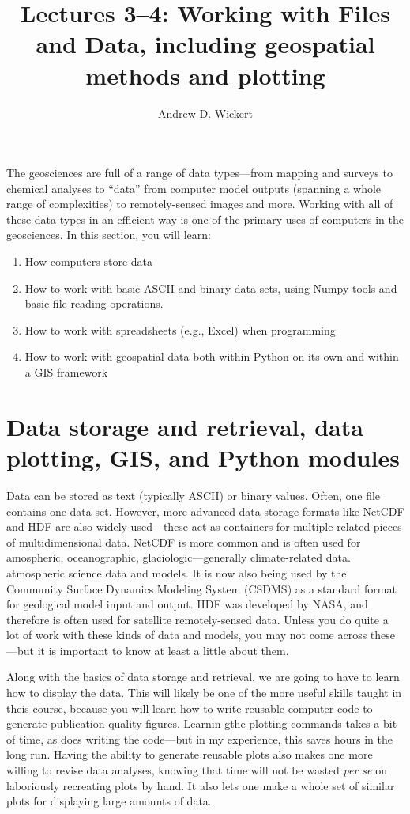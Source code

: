 \documentclass[a4paper,10pt]{scrartcl}
\title{Lectures 3--4: Working with Files and Data, including geospatial methods and plotting}
\author{Andrew D. Wickert}
\begin{document}
\maketitle

The geosciences are full of a range of data types---from mapping and surveys to chemical analyses to ``data'' from computer model outputs (spanning a whole range of complexities) to remotely-sensed images and more. Working with all of these data types in an efficient way is one of the primary uses of computers in the geosciences. In this section, you will learn:

\begin{enumerate}
 \item How computers store data
 \item How to work with basic ASCII and binary data sets, using Numpy tools and basic file-reading operations.
 \item How to work with spreadsheets (e.g., Excel) when programming
 \item How to work with geospatial data both within Python on its own and within a GIS framework
\end{enumerate}

\section{Data storage and retrieval, data plotting, GIS, and Python modules}

Data can be stored as text (typically ASCII) or binary values. Often, one file contains one data set. However, more advanced data storage formats like NetCDF and HDF are also widely-used---these act as containers for multiple related pieces of multidimensional data. NetCDF is more common and is often used for amospheric, oceanographic, glaciologic---generally climate-related data. atmospheric science data and models. It is now also being used by the Community Surface Dynamics Modeling System (CSDMS) as a standard format for geological model input and output. HDF was developed by NASA, and therefore is often used for satellite remotely-sensed data. Unless you do quite a lot of work with these kinds of data and models, you may not come across these---but it is important to know at least a little about them.

Along with the basics of data storage and retrieval, we are going to have to learn how to display the data. This will likely be one of the more useful skills taught in theis course, because you will learn how to write reusable computer code to generate publication-quality figures. Learnin gthe plotting commands takes a bit of time, as does writing the code---but in my experience, this saves hours in the long run. Having the ability to generate reusable plots also makes one more willing to revise data analyses, knowing that time will not be wasted \textit{per se} on laboriously recreating plots by hand. It also lets one make a whole set of similar plots for displaying large amounts of data.
\end{document}
